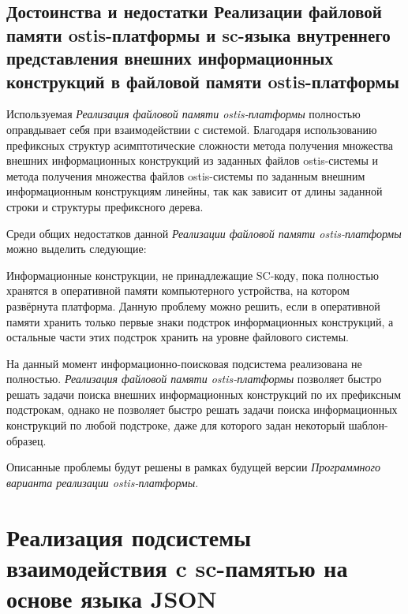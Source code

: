 \subsection{Достоинства и недостатки Реализации файловой памяти ostis-платформы и sc-языка внутреннего представления внешних информационных конструкций в файловой памяти ostis-платформы}
\label{sec_soft_platform_scfin_code_problems}

Используемая \textit{Реализация файловой памяти ostis-платформы} полностью оправдывает себя при взаимодействии с системой. Благодаря использованию префиксных структур асимптотические сложности метода получения множества внешних информационных конструкций из заданных файлов ostis-системы и метода получения множества файлов ostis-системы по заданным внешним информационным конструкциям линейны, так как зависит от длины заданной строки и структуры префиксного дерева.

Среди общих недостатков данной \textit{Реализации файловой памяти ostis-платформы} можно выделить следующие:
\begin{textitemize}
    \item Информационные конструкции, не принадлежащие SC-коду, пока полностью хранятся в оперативной памяти компьютерного устройства, на котором развёрнута платформа. Данную проблему можно решить, если в оперативной памяти хранить только первые знаки подстрок информационных конструкций, а остальные части этих подстрок хранить на уровне файлового системы.
    \item На данный момент информационно-поисковая подсистема реализована не полностью. \textit{Реализация файловой памяти ostis-платформы} позволяет быстро решать задачи поиска внешних информационных конструкций по их префиксным подстрокам, однако не позволяет быстро решать задачи поиска информационных конструкций по любой подстроке, даже для которого задан некоторый шаблон-образец.
\end{textitemize}

Описанные проблемы будут решены в рамках будущей версии \textit{Программного варианта реализации ostis-платформы}.

\section{Реализация подсистемы взаимодействия c sc-памятью на основе языка JSON}
\label{sec_soft_platform_sc_server_subsystem}

